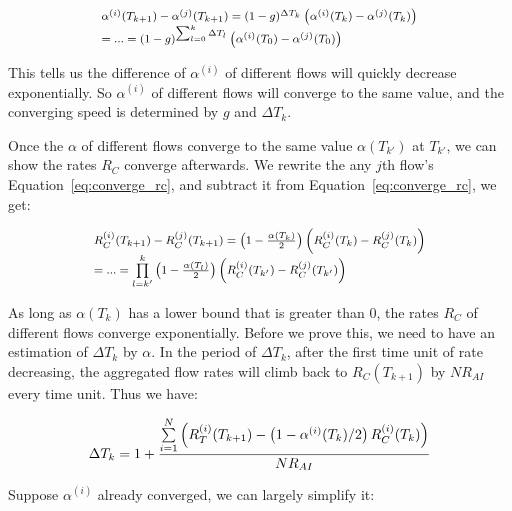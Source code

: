 \begin{equation}
\small
\begin{array}{l}
{\alpha ^{(i)}}({T_{k + 1}}) - {\alpha ^{(j)}}({T_{k + 1}}) = {(1 - g)^{\Delta {T_k}}}\left( {{\alpha ^{(i)}}({T_k}) - {\alpha ^{(j)}}({T_k})} \right)\\
 = ... = {(1 - g)^{\sum\nolimits_{l = 0}^k {\Delta {T_l}} }}\left( {{\alpha ^{(i)}}({T_0}) - {\alpha ^{(j)}}({T_0})} \right)
\end{array}
\end{equation}

This tells us the difference of $\alpha^{(i)}$ of different flows will quickly decrease exponentially. So $\alpha^{(i)}$
of different flows will converge to the same value, and the converging speed is determined by $g$ and
$\Delta T_k$. 

Once the $\alpha$ of different flows converge to the same value $\alpha(T_{k'})$ at $T_{k'}$, we can show 
the rates $R_C$ converge afterwards. We rewrite the any $j$th flow's Equation~\ref{eq:converge_rc}, and subtract it 
from Equation~\ref{eq:converge_rc}, we get:

\begin{equation}
\small
\begin{array}{l}
R_C^{(i)}({T_{k + 1}}) - R_C^{(j)}({T_{k + 1}}) = \left( {1 - \frac{{\alpha ({T_k})}}{2}} \right)\left( {R_C^{(i)}({T_k}) - R_C^{(j)}({T_k})} \right)\\
 = ... = \prod\limits_{l = k'}^k {\left( {1 - \frac{{\alpha ({T_l})}}{2}} \right)} \left( {R_C^{(i)}({T_{k'}}) - R_C^{(j)}({T_{k'}})} \right)
\end{array}
\label{eq:converge}
\end{equation}

As long as $\alpha ({T_k})$ has a lower bound that is greater than 0, the rates $R_C$ of different flows 
converge exponentially. Before we prove this, we need to have an estimation of $\Delta T_k$ by $\alpha$.
In the period of $\Delta T_k$, after the first time unit of rate decreasing, the aggregated flow rates
will climb back to $R_C(T_{k+1})$ by $NR_{AI}$ every time unit. Thus we have:

\begin{equation}
\small\Delta {T_k} = 1 + \frac{{\sum\limits_{i = 1}^N {\left( {R_T^{(i)}({T_{k + 1}}) - \left( {1 - {\alpha ^{(i)}}({T_k})/2} \right)R_C^{(i)}({T_k})} \right)} }}{{N{R_{AI}}}}
\end{equation}

Suppose $\alpha^{(i)}$ already converged, we can largely simplify it:

